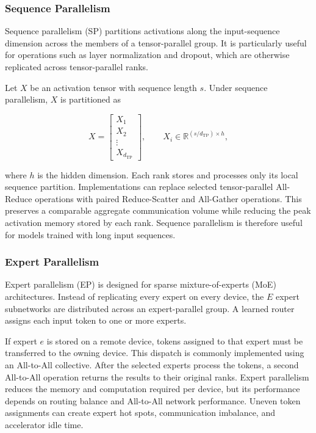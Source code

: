 \documentclass[11pt,journal,final, onecolumn]{IEEEtran}
\begin{document}
\subsubsection{Sequence Parallelism}

Sequence parallelism (SP) partitions activations along the input-sequence
dimension across the members of a tensor-parallel group. It is particularly
useful for operations such as layer normalization and dropout, which are
otherwise replicated across tensor-parallel ranks.

Let \(X\) be an activation tensor with sequence length \(s\). Under sequence
parallelism, \(X\) is partitioned as

\begin{equation}
    X =
    \begin{bmatrix}
        X_1    \\
        X_2    \\
        \vdots \\
        X_{d_{\mathrm{TP}}}
    \end{bmatrix},
    \qquad
    X_i \in
    \mathbb{R}^{(s/d_{\mathrm{TP}})\times h},
    \label{eq:sequence-partition}
\end{equation}

where \(h\) is the hidden dimension. Each rank stores and processes only its
local sequence partition. Implementations can replace selected tensor-parallel
All-Reduce operations with paired Reduce-Scatter and All-Gather operations.
This preserves a comparable aggregate communication volume while reducing
the peak activation memory stored by each rank. Sequence parallelism is
therefore useful for models trained with long input sequences.

\subsubsection{Expert Parallelism}

Expert parallelism (EP) is designed for sparse mixture-of-experts (MoE)
architectures. Instead of replicating every expert on every device, the
\(E\) expert subnetworks are distributed across an expert-parallel group.
A learned router assigns each input token to one or more experts.

If expert \(e\) is stored on a remote device, tokens assigned to that expert
must be transferred to the owning device. This dispatch is commonly
implemented using an All-to-All collective. After the selected experts process
the tokens, a second All-to-All operation returns the results to their original
ranks. Expert parallelism reduces the memory and computation required per
device, but its performance depends on routing balance and All-to-All network
performance. Uneven token assignments can create expert hot spots,
communication imbalance, and accelerator idle time.
\end{document}
